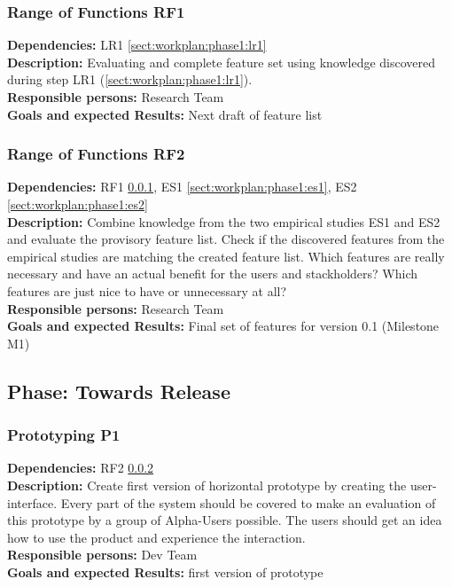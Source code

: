 \documentclass[a4paper,11pt]{article}
\begin{document}
\subsubsection{Range of Functions RF1}
\label{sect:workplan:phase1:rf1}
\textbf{Dependencies:} LR1 \ref{sect:workplan:phase1:lr1}\\
\textbf{Description:} Evaluating and complete feature set using knowledge discovered during step LR1 (\ref{sect:workplan:phase1:lr1}).\\
\textbf{Responsible persons:} Research Team\\
\textbf{Goals and expected Results:} Next draft of  feature list\\

\pagebreak
\subsubsection{Range of Functions RF2}
\label{sect:workplan:phase1:rf2}
\textbf{Dependencies:} RF1 \ref{sect:workplan:phase1:rf1}, ES1 \ref{sect:workplan:phase1:es1}, ES2 \ref{sect:workplan:phase1:es2}\\
\textbf{Description:} Combine knowledge from the two empirical studies ES1 and ES2 and evaluate the provisory feature list. Check if the discovered features from the empirical studies are matching the created feature list. Which features are really necessary and have an actual benefit for the users and stackholders? Which features are just nice to have or unnecessary at all?\\
\textbf{Responsible persons:} Research Team\\
\textbf{Goals and expected Results:} Final set of features for version 0.1 (Milestone M1)\\

\subsection{Phase: Towards Release}
\label{sect:workplan:towardsrelease}

\subsubsection{Prototyping P1}
\label{sect:workplan:phase2:p1}
\textbf{Dependencies:} RF2 \ref{sect:workplan:phase1:rf2}\\
\textbf{Description:} Create first version of horizontal prototype by creating the user-interface. Every part of the system should be covered to make an evaluation of this prototype by a group of Alpha-Users possible. The users should get an idea how to use the product and experience the interaction.\\
\textbf{Responsible persons:} Dev Team\\
\textbf{Goals and expected Results:} first version of prototype\\
\end{document}
